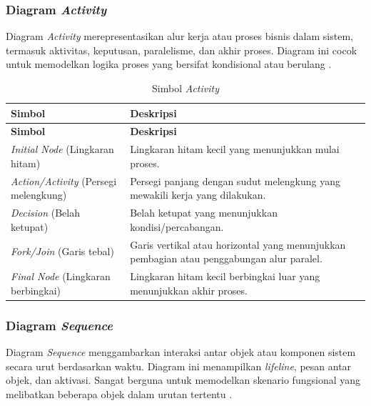 \subsubsection{Diagram \textit{Activity}} \label{II.DiagramActivity}
Diagram \textit{Activity} merepresentasikan alur kerja atau proses bisnis dalam sistem, termasuk aktivitas, keputusan, paralelisme, dan akhir proses. Diagram ini cocok untuk memodelkan logika proses yang bersifat kondisional atau berulang \cite{alfedaghi2021validation}.\par

\begin{longtable}{|p{}|p{}|}
	\caption{Simbol \textit{Activity}}
	\label{table:2.simbolActivity}\\
	\hline
	\textbf{Simbol} & \textbf{Deskripsi} \\
	\hline
	\endfirsthead
	\hline
	\textbf{Simbol} & \textbf{Deskripsi} \\
	\hline
	\endhead
	\textit{Initial Node} (Lingkaran hitam) & Lingkaran hitam kecil yang menunjukkan mulai proses. \\
	\hline
	\textit{Action/Activity} (Persegi melengkung) & Persegi panjang dengan sudut melengkung yang mewakili kerja yang dilakukan. \\
	\hline
	\textit{Decision} (Belah ketupat) & Belah ketupat yang menunjukkan kondisi/percabangan. \\
	\hline
	\textit{Fork/Join} (Garis tebal) & Garis vertikal atau horizontal yang menunjukkan pembagian atau penggabungan alur paralel. \\
	\hline
	\textit{Final Node} (Lingkaran berbingkai) & Lingkaran hitam kecil berbingkai luar yang menunjukkan akhir proses. \\
	\hline
\end{longtable}

\subsubsection{Diagram \textit{Sequence}} \label{II.DiagramSequence}
Diagram \textit{Sequence} menggambarkan interaksi antar objek atau komponen sistem secara urut berdasarkan waktu. Diagram ini menampilkan \textit{lifeline}, pesan antar objek, dan aktivasi. Sangat berguna untuk memodelkan skenario fungsional yang melibatkan beberapa objek dalam urutan tertentu \cite{tavares2021classification}.\par

